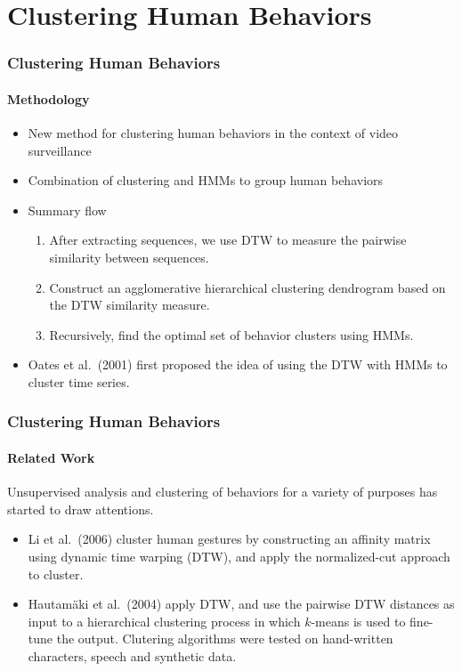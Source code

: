 
\section{Clustering Human Behaviors}

\ifnum{}

\begin{frame}
    \frametitle{Clustering Human Behaviors}
    \framesubtitle{Methodology}
    
    \begin{itemize}
        \item New method for clustering human behaviors in the context 
            of video surveillance
        \item Combination of clustering and HMMs to group human behaviors
        \item Summary flow
            \begin{enumerate}
                \item After extracting sequences, we use DTW to measure 
                    the pairwise similarity between sequences.
                \item Construct an agglomerative hierarchical clustering 
                    dendrogram based on the DTW similarity measure.
                \item Recursively, find the optimal set of behavior clusters 
                    using HMMs.
            \end{enumerate}
        \item Oates et al.\ (2001) first proposed the idea of using the DTW 
            with HMMs to cluster time series.
    \end{itemize}
  
\end{frame}


\begin{frame}
    \frametitle{Clustering Human Behaviors}
    \framesubtitle{Related Work}

    Unsupervised analysis and clustering of behaviors for a variety of 
    purposes has started to draw attentions.

    \begin{itemize}
        \item Li et al.\ (2006) cluster human gestures by constructing an affinity 
            matrix using dynamic time warping (DTW), and apply the normalized-cut 
            approach to cluster.
        \item Hautam\"{a}ki et al.\ (2004) apply DTW, and use the pairwise DTW 
            distances as input to a hierarchical clustering process in which $k$-means 
            is used to fine-tune the output. Clutering algorithms were tested on 
            hand-written characters, speech and synthetic data.
    \end{itemize}

\end{frame}


